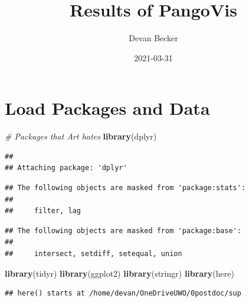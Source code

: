 \documentclass[
]{article}
\title{Results of PangoVis}
\author{Devan Becker}
\date{2021-03-31}
\newenvironment{Shaded}{\begin{snugshade}}{\end{snugshade}}
\newcommand{\CommentTok}[1]{\textcolor[rgb]{0.56,0.35,0.01}{\textit{#1}}}
\newcommand{\KeywordTok}[1]{\textcolor[rgb]{0.13,0.29,0.53}{\textbf{#1}}}
\newcommand{\NormalTok}[1]{#1}
\begin{document}
\maketitle

\hypertarget{load-packages-and-data}{%
\section{Load Packages and Data}\label{load-packages-and-data}}

\begin{Shaded}
\begin{Highlighting}[]
\CommentTok{\# Packages that Art hates}
\KeywordTok{library}\NormalTok{(dplyr)}
\end{Highlighting}
\end{Shaded}

\begin{verbatim}
## 
## Attaching package: 'dplyr'
\end{verbatim}

\begin{verbatim}
## The following objects are masked from 'package:stats':
## 
##     filter, lag
\end{verbatim}

\begin{verbatim}
## The following objects are masked from 'package:base':
## 
##     intersect, setdiff, setequal, union
\end{verbatim}

\begin{Shaded}
\begin{Highlighting}[]
\KeywordTok{library}\NormalTok{(tidyr)}
\KeywordTok{library}\NormalTok{(ggplot2)}
\KeywordTok{library}\NormalTok{(stringr)}
\KeywordTok{library}\NormalTok{(here)}
\end{Highlighting}
\end{Shaded}

\begin{verbatim}
## here() starts at /home/devan/OneDriveUWO/0postdoc/sup
\end{verbatim}
\end{document}
